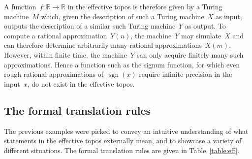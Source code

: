 \documentclass[oneside]{amsart}
\theoremstyle{definition}
\theoremstyle{plain}
\theoremstyle{remark}
\newcommand{\RR}{\mathbb{R}}
\renewcommand{\_}{\mathpunct{.}\,}
\newcommand{\effective}{ef{}fective\xspace}
\newcommand{\?}{\,{:}\,}
\begin{document}
A function~$f : \RR \to \RR$ in the \effective topos is therefore given by a
Turing machine~$M$ which, given the description of such a Turing machine~$X$ as
input, outputs the description of a similar such Turing machine~$Y$ as output.
To compute a rational approximation~$Y(n)$, the machine~$Y$ may simulate~$X$
and can therefore determine arbitrarily many rational approximations~$X(m)$.
However, within finite time, the machine~$Y$ can only acquire finitely many
such approximations. Hence a function such as the signum function, for which
even rough rational approximations of~$\operatorname{sgn}(x)$ require infinite
precision in the input~$x$, do not exist in the \effective topos.


\subsection*{The formal translation rules} The previous examples were picked to
convey an intuitive understanding of what statements in the \effective topos
externally mean, and to showcase a variety of different situations. The
formal translation rules are given in Table~\ref{table:eff}.
\end{document}
